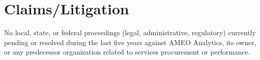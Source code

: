 \section{Claims/Litigation}

No local, state, or federal proceedings (legal, administrative, regulatory) currently pending or resolved during the last five years against AMEO Analytics, its owner, or any predecessor organization related to services procurement or performance.